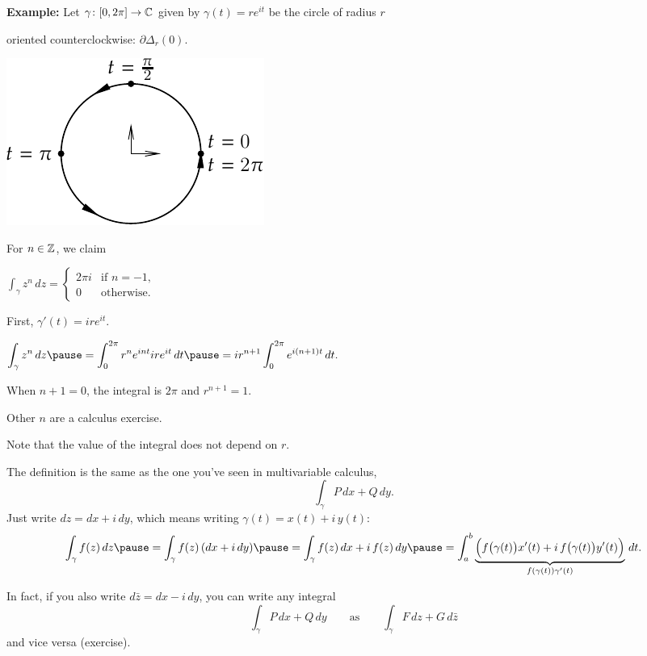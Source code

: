 \documentclass[10pt,aspectratio=169]{beamer}
\begin{document}
\begin{frame}
\textbf{Example:}
Let $\gamma \colon [0,2\pi] \to {\mathbb{C}}$ given by $\gamma(t) = r e^{it}$ be
the circle of radius $r$

oriented counterclockwise: $\partial \Delta_r(0)$.

\hspace{3in}%
\includegraphics{../figures/circlepath}

\vspace*{-1.3in}
\pause
For $n \in {\mathbb{Z}}$, we claim

\medskip
\qquad
$\displaystyle
\int_\gamma z^n \, dz
=
\begin{cases}
2\pi i & \text{if } n=-1, \\
0 & \text{otherwise.}
\end{cases}
$

\pause
\medskip

First, $\gamma'(t) = i r e^{it}$.

\pause
\medskip

\qquad
$\displaystyle
\int_\gamma z^n \, dz
\pause
=
\int_0^{2\pi}
r^n
e^{int} i r e^{it} \, dt
\pause
=
i r^{n+1}
\int_0^{2\pi}
e^{i(n+1)t} \, dt .
$

\pause
\medskip

When $n+1=0$, the integral is $2\pi$ and $r^{n+1}=1$.

\medskip
\pause

Other $n$ are a calculus exercise.

\medskip
\pause

Note that the value of the integral does not depend on $r$.
\end{frame}

\begin{frame}
The definition is the same as the one you've seen in multivariable calculus,
\[
\int_\gamma P \, dx + Q \, dy .
\]
\medskip
\pause
Just write $dz = dx + i \, dy$, which means writing
$\gamma(t) = x(t) + i\, y(t)$:
\[
\int_{\gamma} f(z) \, dz
\pause
=
\int_{\gamma} f(z) \, (dx + i\, dy)
\pause
=
\int_{\gamma} f(z) \, dx + i \, f(z) \, dy
\pause
=
\int_a^b \underbrace{\Bigl( f\bigl(\gamma(t)\bigr) x'(t) + i \, f\bigl(\gamma(t)\bigr) y'(t) \Bigr)}_{f(\gamma(t)) \gamma'(t)} \, dt .
\]
\medskip
\pause

In fact, if you also write $d\bar{z} = dx - i \, dy$, you can write any
integral
\[
\int_{\gamma} P \, dx + Q \, dy
\qquad \text{as} \qquad
\int_{\gamma} F \, dz + G \, d\bar{z}
\]
and vice versa (exercise).
\end{frame}
\end{document}
